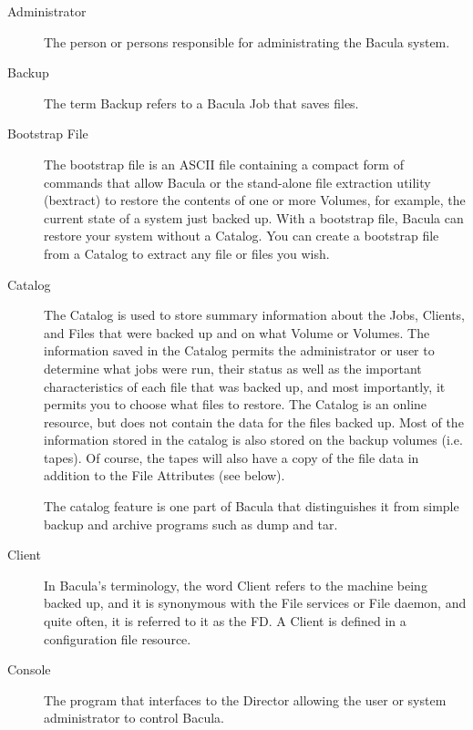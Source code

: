 \begin{description}

\item [Administrator]
   The person or persons responsible for administrating the Bacula system. 

\item [Backup]
   The term Backup refers to a Bacula Job that saves files. 

\item [Bootstrap File]
   The bootstrap file is an ASCII file containing a compact form of
   commands that allow Bacula or the stand-alone file extraction utility
   (bextract) to restore the contents of one or more Volumes, for
   example, the current state of a system just backed up.  With a bootstrap
   file, Bacula can restore your system without a Catalog.  You can create
   a bootstrap file from a Catalog to extract any file or files you wish.

\item [Catalog]
   The Catalog is used to store summary information about the Jobs,
   Clients, and Files that were backed up and on what Volume or Volumes.
   The information saved in the Catalog permits the administrator or user
   to determine what jobs were run, their status as well as the important
   characteristics of each file that was backed up, and most importantly,
   it permits you to choose what files to restore.
   The Catalog is an
   online resource, but does not contain the data for the files backed up.
   Most of the information stored in the catalog is also stored on the
   backup volumes (i.e.  tapes).  Of course, the tapes will also have a
   copy of the file data in addition to the File Attributes (see below).

   The catalog feature is one part of Bacula that distinguishes it from
   simple backup and archive programs such as dump and tar.

\item [Client]
   In Bacula's terminology, the word Client refers to the machine being
   backed up, and it is synonymous with the File services or File daemon,
   and quite often, it is referred to it as the FD. A Client is defined in a
   configuration file resource.

\item [Console]
   The program that interfaces to the Director allowing  the user or system
   administrator to control Bacula. 


\end{description}
